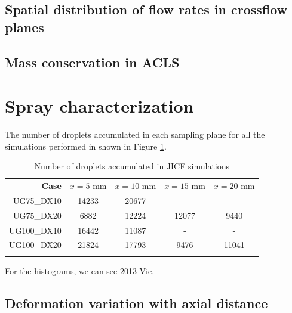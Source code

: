 \subsection{Spatial distribution of flow rates in crossflow planes}




\newpage

\subsection{Mass conservation in ACLS}
\label{subsec:ch5_mass_conservation_ACLS_set_levelset_band}


\newpage

\section{Spray characterization}
\label{sec:ch5_sec_spray_characterization}

The number of droplets accumulated in each sampling plane for all the simulations performed in shown in Figure \ref{tab:jicf_Ndr_accumulated}.

\begin{table}[!h]
\centering
\caption{Number of droplets accumulated in JICF simulations}
\begin{tabular}{rcccc}
\thickhline
\textbf{Case} & $x = 5$ mm & $x = 10$ mm & $x = 15$ mm  & $x = 20$ mm \\
\thickhline 
UG75\_DX10  & 14233 & 20677 & - & - \\
UG75\_DX20  &  6882 & 12224 & 12077 & 9440 \\
UG100\_DX10 & 16442 & 11087 & - & -\\
UG100\_DX20 & 21824 & 17793 & 9476 & 11041 \\
\thickhline
\end{tabular}
\label{tab:jicf_Ndr_accumulated}
\end{table}

For the histograms, we can see 2013 Vie.


\subsection{Deformation variation with axial distance}

